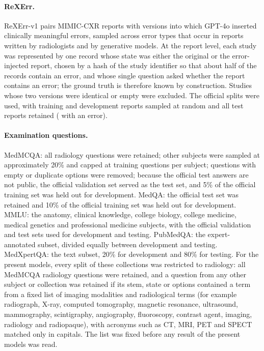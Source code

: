 \documentclass[11pt]{article}
\begin{document}
\paragraph{ReXErr.} ReXErr-v1 \citep{rao2025rexerr} pairs MIMIC-CXR reports \citep{johnson2019mimiccxr} with versions into which GPT-4o inserted clinically meaningful errors, sampled across error types that occur in reports written by radiologists and by generative models. At the report level, each study was represented by one record whose state was either the original or the error-injected report, chosen by a hash of the study identifier so that about half of the records contain an error, and whose single question asked whether the report contains an error; the ground truth is therefore known by construction. Studies whose two versions were identical or empty were excluded. The official splits were used, with  training and  development reports sampled at random and all  test reports retained ( with an error).

\paragraph{Examination questions.} MedMCQA: all radiology questions were retained; other subjects were sampled at approximately 20\% and capped at  training questions per subject; questions with empty or duplicate options were removed; because the official test answers are not public, the official validation set served as the test set, and 5\% of the official training set was held out for development. MedQA: the official test set was retained and 10\% of the official training set was held out for development. MMLU: the anatomy, clinical knowledge, college biology, college medicine, medical genetics and professional medicine subjects, with the official validation and test sets used for development and testing. PubMedQA: the expert-annotated subset, divided equally between development and testing. MedXpertQA: the text subset, 20\% for development and 80\% for testing. For the present models, every split of these collections was restricted to radiology: all MedMCQA radiology questions were retained, and a question from any other subject or collection was retained if its stem, state or options contained a term from a fixed list of imaging modalities and radiological terms (for example radiograph, X-ray, computed tomography, magnetic resonance, ultrasound, mammography, scintigraphy, angiography, fluoroscopy, contrast agent, imaging, radiology and radiopaque), with acronyms such as CT, MRI, PET and SPECT matched only in capitals. The list was fixed before any result of the present models was read.
\end{document}
